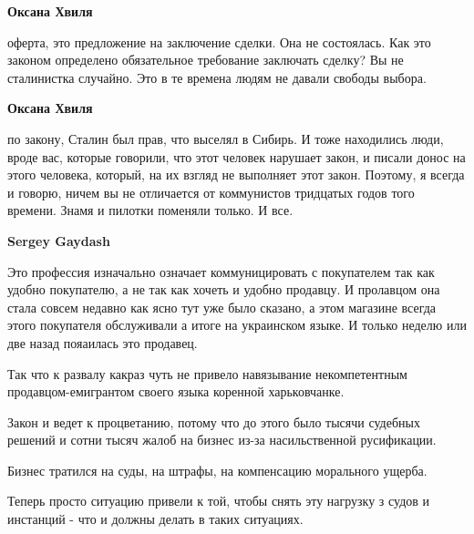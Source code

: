 \begin{itemize}
\begin{itemize}
 
\textbf{Оксана Хвиля} 

оферта, это предложение на заключение сделки. Она не состоялась. Как это
законом определено обязательное требование заключать сделку? Вы не сталинистка
случайно. Это в те времена людям не давали свободы выбора.


 
\textbf{Оксана Хвиля} 

по закону, Сталин был прав, что выселял в Сибирь. И тоже находились люди, вроде
вас, которые говорили, что этот человек нарушает закон, и писали донос на этого
человека, который, на их взгляд не выполняет этот закон. Поэтому, я всегда и
говорю, ничем вы не отличается от коммунистов тридцатых годов того времени.
Знамя и пилотки поменяли только. И все.

 
\textbf{Sergey Gaydash}

Это профессия изначально означает коммуницировать с покупателем так как удобно
покупателю, а не так как хочеть и удобно продавцу. И пролавцом она стала совсем
недавно как ясно тут уже было сказано, а этом магазине всегда этого покупателя
обслуживали а итоге на украинском языке. И только неделю или две назад
пояаилась это продавец.

Так что к развалу какраз чуть не привело навязывание некомпетентным
продавцом-емигрантом своего языка коренной харьковчанке.

Закон и ведет к процветанию, потому что до этого было тысячи судебных решений и
сотни тысяч жалоб на бизнес из-за насильственной русификации.

Бизнес тратился на суды, на штрафы, на компенсацию морального ущерба.

Теперь просто ситуацию привели к той, чтобы снять эту нагрузку з судов и
инстанций - что и должны делать в таких ситуациях.


\end{itemize}
\end{itemize}
